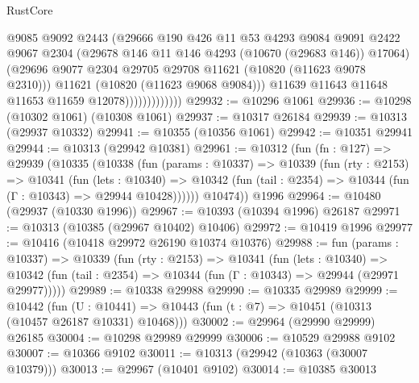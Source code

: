 \begin{lexlean}{RustCore}
\begin{coremodule}
                              @9085
                              @9092
                              @2443
                              (@29666
                                @190
                                @426
                                @11
                                @53
                                @4293
                                @9084
                                @9091
                                @2422
                                @9067
                                @2304
                                (@29678 @146 @11 @146 @4293 (@10670 (@29683 @146)) @17064)
                                (@29696
                                  @9077
                                  @2304
                                  @29705
                                  @29708
                                  @11621
                                  (@10820 (@11623 @9078 @2310)))
                                @11621
                                (@10820 (@11623 @9068 @9084)))
                              @11639
                              @11643
                              @11648
                              @11653
                              @11659
                              @12078)))))))))))))
@29932 := @10296 @1061
@29936 := @10298 (@10302 @1061) (@10308 @1061)
@29937 := @10317 @26184
@29939 := @10313 (@29937 @10332)
@29941 := @10355 (@10356 @1061)
@29942 := @10351 @29941
@29944 := @10313 (@29942 @10381)
@29961 := @10312
    (fun (fn : @127) =>
    @29939
      (@10335
        (@10338
          (fun (params : @10337) =>
          @10339
            (fun (rty : @2153) =>
            @10341
              (fun (lets : @10340) =>
              @10342 (fun (tail : @2354) => @10344 (fun (Γ : @10343) => @29944 @10428))))))
        @10474))
    @1996
@29964 := @10480 (@29937 (@10330 @1996))
@29967 := @10393 (@10394 @1996) @26187
@29971 := @10313 (@10385 (@29967 @10402) @10406)
@29972 := @10419 @1996
@29977 := @10416 (@10418 @29972 @26190 @10374 @10376)
@29988 := fun (params : @10337) =>
  @10339
    (fun (rty : @2153) =>
    @10341
      (fun (lets : @10340) =>
      @10342 (fun (tail : @2354) => @10344 (fun (Γ : @10343) => @29944 (@29971 @29977)))))
@29989 := @10338 @29988
@29990 := @10335 @29989
@29999 := @10442
    (fun (U : @10441) => @10443 (fun (t : @7) => @10451 (@10313 (@10457 @26187 @10331) @10468)))
@30002 := @29964 (@29990 @29999) @26185
@30004 := @10298 @29989 @29999
@30006 := @10529 @29988 @9102
@30007 := @10366 @9102
@30011 := @10313 (@29942 (@10363 (@30007 @10379)))
@30013 := @29967 (@10401 @9102)
@30014 := @10385 @30013

\end{coremodule}
\end{lexlean}
